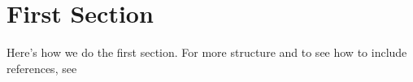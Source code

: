 \documentclass[../chapter01.tex]{subfile}
\begin{document}
\section[First Section]{First Section}\label{sec:First Section}

Here's how we do the first section. For more structure and to see how to include references, see~\cite{qwinters2021repoTemplate}
\end{document}
